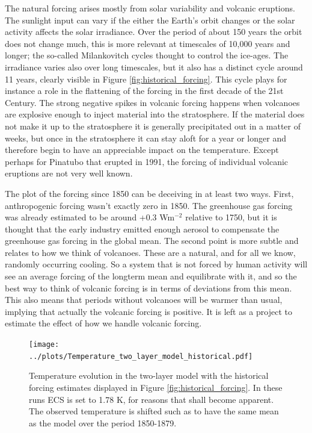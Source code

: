 \documentclass[12pt]{book}
\begin{document}
\vspace{0.5 cm}
\noindent
The natural forcing arises mostly from solar variability and volcanic eruptions. The sunlight input can vary if the either the Earth's orbit changes or the solar activity affects the solar irradiance. Over the period of about 150 years the orbit does not change much, this is more relevant at timescales of 10,000 years and longer; the so-called Milankovitch cycles thought to control the ice-ages. The irradiance varies also over long timescales, but it also has a distinct cycle around 11 years, clearly visible in Figure \ref{fig:historical_forcing}. This cycle plays for instance a role in the flattening of the forcing in the first decade of the 21st Century.
The strong negative spikes in volcanic forcing happens when volcanoes are explosive enough to inject material into the stratosphere. If the material does not make it up to the stratosphere it is generally precipitated out in a matter of weeks, but once in the stratosphere it can stay aloft for a year or longer and therefore begin to have an appreciable impact on the temperature. Except perhaps for Pinatubo that erupted in 1991, the forcing of individual volcanic eruptions are not very well known. 

The plot of the forcing since 1850 can be deceiving in at least two ways. First, anthropogenic forcing wasn't exactly zero in 1850. The greenhouse gas forcing was already estimated to be around +0.3 Wm$^{-2}$ relative to 1750, but it is thought that the early industry emitted enough aerosol to compensate the greenhouse gas forcing in the global mean. The second point is more subtle and relates to how we think of volcanoes. These are a natural, and for all we know, randomly occurring cooling. So a system that is not forced by human activity will see an average forcing of the longterm mean and equilibrate with it, and so the best way to think of volcanic forcing is in terms of deviations from this mean. This also means that periods without volcanoes will be warmer than usual, implying that actually the volcanic forcing is positive. It is left as a project to estimate the effect of how we handle volcanic forcing.

\begin{figure}
\begin{center}
\texttt{[image: ../plots/Temperature\_two\_layer\_model\_historical.pdf]}
\end{center}
\caption{ Temperature evolution in the two-layer model with the historical forcing estimates displayed in Figure \ref{fig:historical_forcing}. In these runs ECS is set to 1.78 K, for reasons that shall become apparent. The observed temperature is shifted such as to have the same mean as the model over the period 1850-1879. } 
\label{fig:historical_two-layer}
\end{figure}
\end{document}
